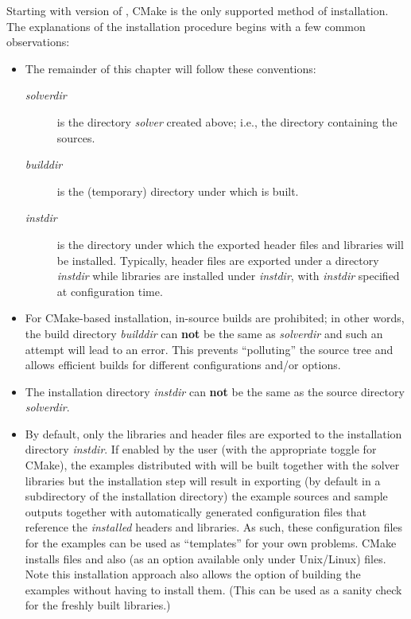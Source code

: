 Starting with version  of {\sundials}, CMake is the only supported method
of installation.
The explanations of the installation procedure begins with a few common observations:
\begin{itemize}

\item The remainder of this chapter will follow these conventions:
  \begin{description}
  \item[{\em solverdir}] 
    is the directory {\em solver} created above; i.e., the 
    directory containing the {\sundials} sources.
  \item[{\em builddir}]
    is the (temporary) directory under which {\sundials} is built.
  \item[{\em instdir}]
    is the directory under which the {\sundials} exported header files
    and libraries will be installed. Typically, header files are exported under a directory
    {\em instdir} while libraries are installed under {\em instdir},
    with {\em instdir} specified at configuration time.
  \end{description}

\item For {\sundials} CMake-based installation, in-source builds are prohibited; in other words, the
  build directory {\em builddir} can {\bf not} be the same as {\em solverdir}
  and such an attempt will lead to an error. This
  prevents ``polluting'' the source tree and allows efficient builds
  for different configurations and/or options.

\item {\warn}The installation directory {\em instdir} can {\bf not} be the same as
  the source directory {\em solverdir}.

\item By default, only the libraries and header files are exported to the installation
  directory {\em instdir}.  If enabled by the user (with the
  appropriate toggle for CMake), the
  examples distributed with {\sundials} will be built together with
  the solver libraries but the installation step will result in
  exporting (by default in a subdirectory of the installation
  directory) the example sources and sample outputs together with
  automatically generated configuration files that reference the {\em
  installed} {\sundials} headers and libraries.  As such, these
  configuration files for the {\sundials} examples can be used as
  ``templates'' for your own problems. CMake installs  files and also
  (as an option available only under Unix/Linux)  files. Note this
  installation approach also allows the option of building the
  {\sundials} examples without having to install them.  (This can be
  used as a sanity check for the freshly built libraries.)


\end{itemize}

